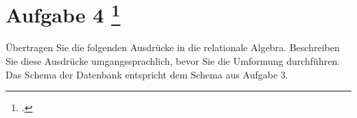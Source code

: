 \documentclass{lehramt-informatik-aufgabe}
\begin{document}
\section{Aufgabe 4
\footcite{examen:66116:2019:09}}

Übertragen Sie die folgenden Ausdrücke in die relationale Algebra.
Beschreiben Sie diese Ausdrücke umgangssprachlich, bevor Sie die
Umformung durchführen. Das Schema der Datenbank entspricht dem Schema
aus Aufgabe 3.



\end{document}
